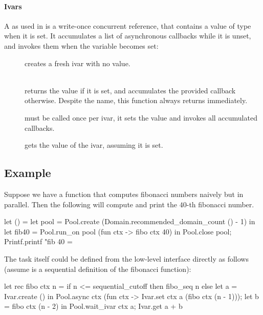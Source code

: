 \paragraph{Ivars} A  as used in  is a write-once concurrent reference, that contains a value of type  when it is set. It accumulates a list of asynchronous callbacks while it is unset, and invokes them when the variable becomes set:
\begin{description}
\item[] creates a fresh ivar with no value.

\item[] ~\\
  returns the value if it is set, and accumulates the provided callback
  otherwise. Despite the name, this function always returns immediately.

\item[]
  must be called once per ivar, it sets the value and invokes all
  accumulated callbacks.

\item[]

\item[]
  gets the value of the ivar, assuming it is set.
\end{description}

\subsection{Example}
\label{sec:parabs_pool_example}

Suppose we have a
%
%
function that computes fibonacci numbers naively but in parallel. Then
the following will compute and print the $40$-th fibonacci number.
\begin{ocamlcode}
let () =
  let pool = Pool.create (Domain.recommended_domain_count () - 1) in
  let fib40 = Pool.run_on pool (fun ctx -> fibo ctx 40) in
  Pool.close pool;
  Printf.printf "fib 40 = %
\end{ocamlcode}

The  task itself could be defined from the low-level
interface directly as follows (assume  is
a sequential definition of the fibonacci function):
\begin{ocamlcode}
let rec fibo ctx n =
  if n <= sequential_cutoff then fibo_seq n
  else
    let a = Ivar.create () in
    Pool.async ctx (fun ctx -> Ivar.set ctx a (fibo ctx (n - 1)));
    let b = fibo ctx (n - 2) in
    Pool.wait_ivar ctx a;
    Ivar.get a + b
\end{ocamlcode}

